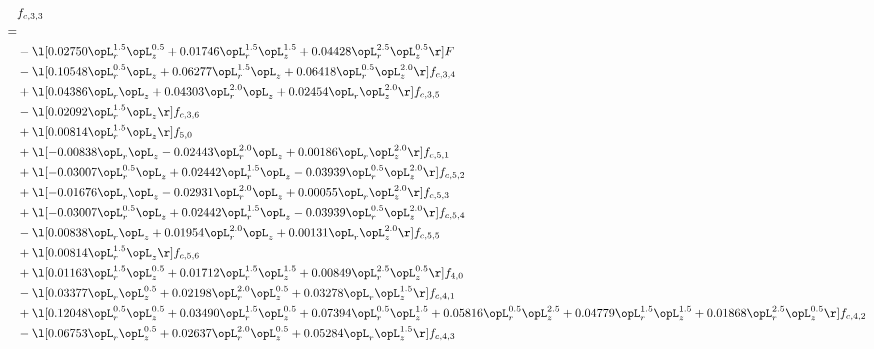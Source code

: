 \begin{alignat}{2} 
\label{eq:f_33_2} 
& f_{c,3,3} \nonumber \\ 
 = \\ 
& - \l[  0.02750 \opL_r^{1.5} \opL_z^{0.5} +  0.01746 \opL_r^{1.5} \opL_z^{1.5} +  0.04428 \opL_r^{2.5} \opL_z^{0.5}  \r] F \nonumber \\ 
& - \l[  0.10548 \opL_r^{0.5} \opL_z +  0.06277 \opL_r^{1.5} \opL_z +  0.06418 \opL_r^{0.5} \opL_z^{2.0}  \r] f_{c,3,4} \nonumber \\ 
& + \l[  0.04386 \opL_r \opL_z +  0.04303 \opL_r^{2.0} \opL_z +  0.02454 \opL_r \opL_z^{2.0}  \r] f_{c,3,5} \nonumber \\ 
& - \l[  0.02092 \opL_r^{1.5} \opL_z  \r] f_{c,3,6} \nonumber \\ 
& + \l[  0.00814 \opL_r^{1.5} \opL_z  \r] f_{5,0} \nonumber \\ 
& + \l[  -0.00838 \opL_r \opL_z   -0.02443 \opL_r^{2.0} \opL_z +  0.00186 \opL_r \opL_z^{2.0}  \r] f_{c,5,1} \nonumber \\ 
& + \l[  -0.03007 \opL_r^{0.5} \opL_z +  0.02442 \opL_r^{1.5} \opL_z   -0.03939 \opL_r^{0.5} \opL_z^{2.0}  \r] f_{c,5,2} \nonumber \\ 
& + \l[  -0.01676 \opL_r \opL_z   -0.02931 \opL_r^{2.0} \opL_z +  0.00055 \opL_r \opL_z^{2.0}  \r] f_{c,5,3} \nonumber \\ 
& + \l[  -0.03007 \opL_r^{0.5} \opL_z +  0.02442 \opL_r^{1.5} \opL_z   -0.03939 \opL_r^{0.5} \opL_z^{2.0}  \r] f_{c,5,4} \nonumber \\ 
& - \l[  0.00838 \opL_r \opL_z +  0.01954 \opL_r^{2.0} \opL_z +  0.00131 \opL_r \opL_z^{2.0}  \r] f_{c,5,5} \nonumber \\ 
& + \l[  0.00814 \opL_r^{1.5} \opL_z  \r] f_{c,5,6} \nonumber \\ 
& + \l[  0.01163 \opL_r^{1.5} \opL_z^{0.5} +  0.01712 \opL_r^{1.5} \opL_z^{1.5} +  0.00849 \opL_r^{2.5} \opL_z^{0.5}  \r] f_{4,0} \nonumber \\ 
& - \l[  0.03377 \opL_r \opL_z^{0.5} +  0.02198 \opL_r^{2.0} \opL_z^{0.5} +  0.03278 \opL_r \opL_z^{1.5}  \r] f_{c,4,1} \nonumber \\ 
& + \l[  0.12048 \opL_r^{0.5} \opL_z^{0.5} +  0.03490 \opL_r^{1.5} \opL_z^{0.5} +  0.07394 \opL_r^{0.5} \opL_z^{1.5} +  0.05816 \opL_r^{0.5} \opL_z^{2.5} +  0.04779 \opL_r^{1.5} \opL_z^{1.5} +  0.01868 \opL_r^{2.5} \opL_z^{0.5}  \r] f_{c,4,2} \nonumber \\ 
& - \l[  0.06753 \opL_r \opL_z^{0.5} +  0.02637 \opL_r^{2.0} \opL_z^{0.5} +  0.05284 \opL_r \opL_z^{1.5}  \r] f_{c,4,3} \nonumber \\ 

\end{alignat}
